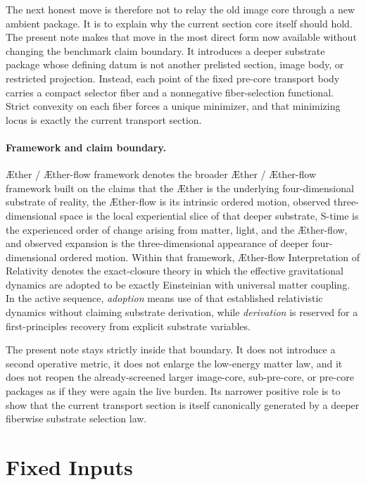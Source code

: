 \documentclass[11pt]{article}
\newcommand{\Aether}{\AE{}ther}
\newcommand{\Aflow}{\AE{}ther-flow}
\newcommand{\TheoryName}{\Aflow{} Interpretation of Relativity}
\newcommand{\TheoryProgram}{\Aether{} / \Aflow{} framework}
\begin{document}
The next honest move is therefore not to relay the old image core through a new ambient package. It is to explain why the current section core itself should hold. The present note makes that move in the most direct form now available without changing the benchmark claim boundary. It introduces a deeper substrate package whose defining datum is not another prelisted section, image body, or restricted projection. Instead, each point of the fixed pre-core transport body carries a compact selector fiber and a nonnegative fiber-selection functional. Strict convexity on each fiber forces a unique minimizer, and that minimizing locus is exactly the current transport section.

\paragraph{Framework and claim boundary.}
\TheoryProgram{} denotes the broader \Aether{} / \Aflow{} framework built on the claims that the \Aether{} is the underlying four-dimensional substrate of reality, the \Aflow{} is its intrinsic ordered motion, observed three-dimensional space is the local experiential slice of that deeper substrate, S-time is the experienced order of change arising from matter, light, and the \Aflow{}, and observed expansion is the three-dimensional appearance of deeper four-dimensional ordered motion. Within that framework, \TheoryName{} denotes the exact-closure theory in which the effective gravitational dynamics are adopted to be exactly Einsteinian with universal matter coupling. In the active sequence, \emph{adoption} means use of that established relativistic dynamics without claiming substrate derivation, while \emph{derivation} is reserved for a first-principles recovery from explicit substrate variables.

The present note stays strictly inside that boundary. It does not introduce a second operative metric, it does not enlarge the low-energy matter law, and it does not reopen the already-screened larger image-core, sub-pre-core, or pre-core packages as if they were again the live burden. Its narrower positive role is to show that the current transport section is itself canonically generated by a deeper fiberwise substrate selection law.

\section{Fixed Inputs}
\end{document}
